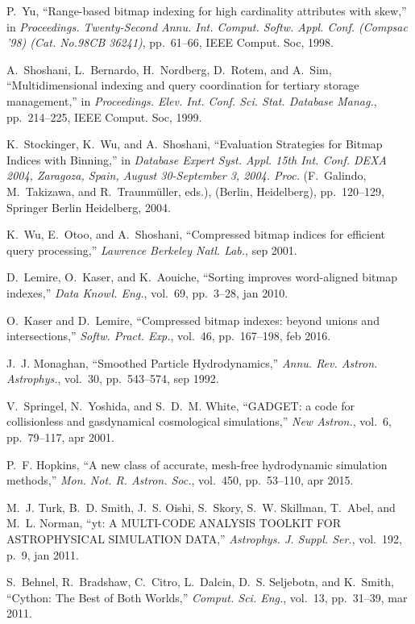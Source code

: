\begin{thebibliography}{10}
P.~Yu, ``{Range-based bitmap indexing for high cardinality attributes with
  skew},'' in {\em Proceedings. Twenty-Second Annu. Int. Comput. Softw. Appl.
  Conf. (Compsac '98) (Cat. No.98CB 36241)}, pp.~61--66, IEEE Comput. Soc,
  1998.

A.~Shoshani, L.~Bernardo, H.~Nordberg, D.~Rotem, and A.~Sim,
  ``{Multidimensional indexing and query coordination for tertiary storage
  management},'' in {\em Proceedings. Elev. Int. Conf. Sci. Stat. Database
  Manag.}, pp.~214--225, IEEE Comput. Soc, 1999.

K.~Stockinger, K.~Wu, and A.~Shoshani, ``{Evaluation Strategies for Bitmap
  Indices with Binning},'' in {\em Database Expert Syst. Appl. 15th Int. Conf.
  DEXA 2004, Zaragoza, Spain, August 30-September 3, 2004. Proc.} (F.~Galindo,
  M.~Takizawa, and R.~Traunm{\"{u}}ller, eds.), (Berlin, Heidelberg),
  pp.~120--129, Springer Berlin Heidelberg, 2004.

K.~Wu, E.~Otoo, and A.~Shoshani, ``{Compressed bitmap indices for efficient
  query processing},'' {\em Lawrence Berkeley Natl. Lab.}, sep 2001.

D.~Lemire, O.~Kaser, and K.~Aouiche, ``{Sorting improves word-aligned bitmap
  indexes},'' {\em Data Knowl. Eng.}, vol.~69, pp.~3--28, jan 2010.

O.~Kaser and D.~Lemire, ``{Compressed bitmap indexes: beyond unions and
  intersections},'' {\em Softw. Pract. Exp.}, vol.~46, pp.~167--198, feb 2016.

J.~J. Monaghan, ``{Smoothed Particle Hydrodynamics},'' {\em Annu. Rev. Astron.
  Astrophys.}, vol.~30, pp.~543--574, sep 1992.

V.~Springel, N.~Yoshida, and S.~D.~M. White, ``{GADGET: a code for
  collisionless and gasdynamical cosmological simulations},'' {\em New
  Astron.}, vol.~6, pp.~79--117, apr 2001.

P.~F. Hopkins, ``{A new class of accurate, mesh-free hydrodynamic simulation
  methods},'' {\em Mon. Not. R. Astron. Soc.}, vol.~450, pp.~53--110, apr 2015.

M.~J. Turk, B.~D. Smith, J.~S. Oishi, S.~Skory, S.~W. Skillman, T.~Abel, and
  M.~L. Norman, ``{yt: A MULTI-CODE ANALYSIS TOOLKIT FOR ASTROPHYSICAL
  SIMULATION DATA},'' {\em Astrophys. J. Suppl. Ser.}, vol.~192, p.~9, jan
  2011.

S.~Behnel, R.~Bradshaw, C.~Citro, L.~Dalcin, D.~S. Seljebotn, and K.~Smith,
  ``{Cython: The Best of Both Worlds},'' {\em Comput. Sci. Eng.}, vol.~13,
  pp.~31--39, mar 2011.

\end{thebibliography}
